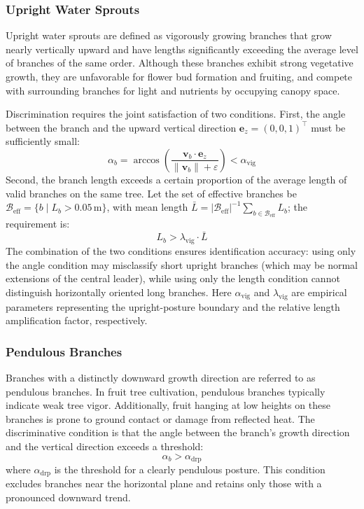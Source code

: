 \documentclass[12pt,a4paper,fontset=fandol]{ctexart}
\newcommand{\vb}[1][b]{\mathbf{v}_{#1}}
\begin{document}
\subsubsection{Upright Water Sprouts}

Upright water sprouts are defined as vigorously growing branches that grow nearly vertically upward and have lengths significantly exceeding the average level of branches of the same order. Although these branches exhibit strong vegetative growth, they are unfavorable for flower bud formation and fruiting, and compete with surrounding branches for light and nutrients by occupying canopy space.

Discrimination requires the joint satisfaction of two conditions.
First, the angle between the branch and the upward vertical direction $\mathbf{e}_z = (0,0,1)^\top$ must be sufficiently small:
\begin{equation}\label{eq:vigorous_angle}
  \alpha_b = \arccos\!\left(\frac{\vb \cdot \mathbf{e}_z}{\|\vb\| + \varepsilon}\right) < \alpha_{\text{vig}}
\end{equation}
Second, the branch length exceeds a certain proportion of the average length of valid branches on the same tree.
Let the set of effective branches be $\mathcal{B}_{\text{eff}} = \{b \mid L_b > 0.05\,\text{m}\}$,
with mean length $\bar{L} = |\mathcal{B}_{\text{eff}}|^{-1}\sum_{b \in \mathcal{B}_{\text{eff}}} L_b$;
the requirement is:
\begin{equation}\label{eq:vigorous_length}
  L_b > \lambda_{\text{vig}} \cdot \bar{L}
\end{equation}
The combination of the two conditions ensures identification accuracy: using only the angle condition may misclassify short upright branches (which may be normal extensions of the central leader), while using only the length condition cannot distinguish horizontally oriented long branches. 
Here $\alpha_{\text{vig}}$ and $\lambda_{\text{vig}}$ are empirical parameters
representing the upright-posture boundary and the relative length amplification factor, respectively.

\subsubsection{Pendulous Branches}

Branches with a distinctly downward growth direction are referred to as pendulous branches. In fruit tree cultivation, pendulous branches typically indicate weak tree vigor. Additionally, fruit hanging at low heights on these branches is prone to ground contact or damage from reflected heat. The discriminative condition is that the angle between the branch's growth direction and the vertical direction exceeds a threshold:
\begin{equation}\label{eq:drooping}
  \alpha_b > \alpha_{\text{drp}}
\end{equation}
where $\alpha_{\text{drp}}$ is the threshold for a clearly pendulous posture.
This condition excludes branches near the horizontal plane and retains only those with a pronounced downward trend.
\end{document}
